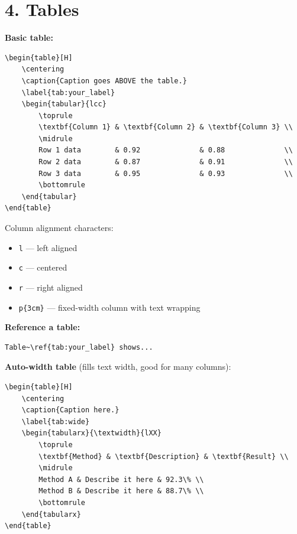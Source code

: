 \section*{4. Tables}

\noindent
\textbf{Basic table:}

\begin{verbatim}
\begin{table}[H]
    \centering
    \caption{Caption goes ABOVE the table.}
    \label{tab:your_label}
    \begin{tabular}{lcc}
        \toprule
        \textbf{Column 1} & \textbf{Column 2} & \textbf{Column 3} \\
        \midrule
        Row 1 data        & 0.92              & 0.88              \\
        Row 2 data        & 0.87              & 0.91              \\
        Row 3 data        & 0.95              & 0.93              \\
        \bottomrule
    \end{tabular}
\end{table}
\end{verbatim}

\noindent
Column alignment characters:
\begin{itemize}
    \item \texttt{l} — left aligned
    \item \texttt{c} — centered
    \item \texttt{r} — right aligned
    \item \texttt{p\{3cm\}} — fixed-width column with text wrapping
\end{itemize}

\noindent
\textbf{Reference a table:}

\begin{verbatim}
Table~\ref{tab:your_label} shows...
\end{verbatim}

\noindent
\textbf{Auto-width table} (fills text width, good for many columns):

\begin{verbatim}
\begin{table}[H]
    \centering
    \caption{Caption here.}
    \label{tab:wide}
    \begin{tabularx}{\textwidth}{lXX}
        \toprule
        \textbf{Method} & \textbf{Description} & \textbf{Result} \\
        \midrule
        Method A & Describe it here & 92.3\% \\
        Method B & Describe it here & 88.7\% \\
        \bottomrule
    \end{tabularx}
\end{table}
\end{verbatim}

